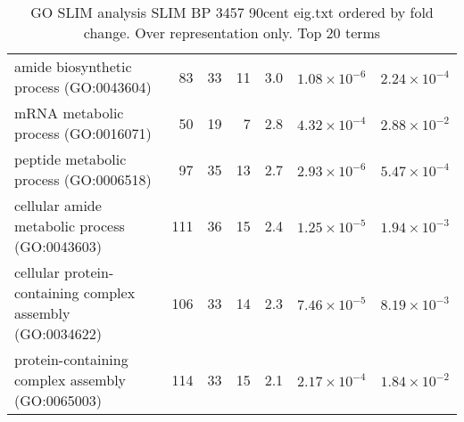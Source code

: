 \begin{table}[ht]
\begin{adjustbox}{width=\textwidth}
\begin{tabular}{lrrrrrr}
  amide biosynthetic process (GO:0043604) & 83 & 33 & 11 & 3.0 & $1.08 \times 10^{-6}$ & $2.24 \times 10^{-4}$ \\ 
  mRNA metabolic process (GO:0016071) & 50 & 19 & 7 & 2.8 & $4.32 \times 10^{-4}$ & $2.88 \times 10^{-2}$ \\ 
  peptide metabolic process (GO:0006518) & 97 & 35 & 13 & 2.7 & $2.93 \times 10^{-6}$ & $5.47 \times 10^{-4}$ \\ 
  cellular amide metabolic process (GO:0043603) & 111 & 36 & 15 & 2.4 & $1.25 \times 10^{-5}$ & $1.94 \times 10^{-3}$ \\ 
  cellular protein-containing complex assembly (GO:0034622) & 106 & 33 & 14 & 2.3 & $7.46 \times 10^{-5}$ & $8.19 \times 10^{-3}$ \\ 
  protein-containing complex assembly (GO:0065003) & 114 & 33 & 15 & 2.1 & $2.17 \times 10^{-4}$ & $1.84 \times 10^{-2}$ \\ 
   \hline
\end{tabular}
\end{adjustbox}
\caption{GO SLIM analysis SLIM BP 3457 90cent eig.txt ordered by fold change. Over representation only. Top 20 terms} 
\label{tab:GO SLIM analysis SLIM BP 3457 90cent eig.txt ordered by fold change. Over representation only. Top 20 terms}
\end{table}
